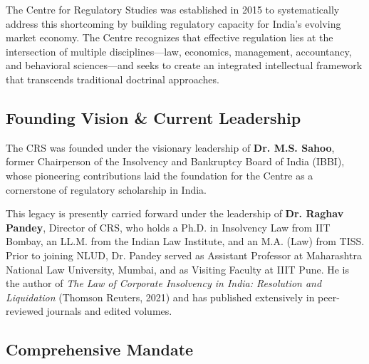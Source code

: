 \documentclass[11pt,a4paper]{article}
\begin{document}
\vspace{0.3cm}

The Centre for Regulatory Studies was established in 2015 to systematically address this shortcoming by building regulatory capacity for India's evolving market economy. The Centre recognizes that effective regulation lies at the intersection of multiple disciplines—law, economics, management, accountancy, and behavioral sciences—and seeks to create an integrated intellectual framework that transcends traditional doctrinal approaches.

\vspace{0.5cm}

\subsection*{Founding Vision \& Current Leadership}

The CRS was founded under the visionary leadership of \textbf{Dr. M.S. Sahoo}, former Chairperson of the Insolvency and Bankruptcy Board of India (IBBI), whose pioneering contributions laid the foundation for the Centre as a cornerstone of regulatory scholarship in India.

\vspace{0.3cm}

This legacy is presently carried forward under the leadership of \textbf{Dr. Raghav Pandey}, Director of CRS, who holds a Ph.D. in Insolvency Law from IIT Bombay, an LL.M. from the Indian Law Institute, and an M.A. (Law) from TISS. Prior to joining NLUD, Dr. Pandey served as Assistant Professor at Maharashtra National Law University, Mumbai, and as Visiting Faculty at IIIT Pune. He is the author of \textit{The Law of Corporate Insolvency in India: Resolution and Liquidation} (Thomson Reuters, 2021) and has published extensively in peer-reviewed journals and edited volumes.

\vspace{0.5cm}

\subsection*{Comprehensive Mandate}
\end{document}
